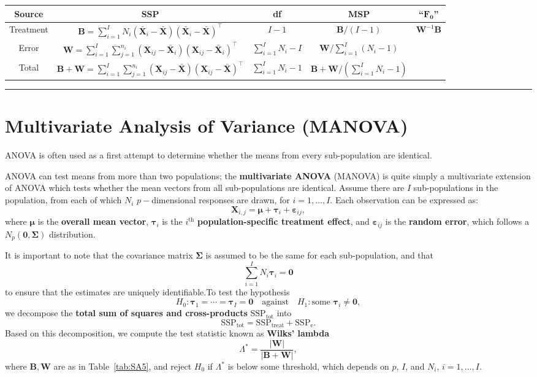 \begin{table*}[ht!]
         \centering
         \begin{tabular}{c c c c c}
         \hline
        \textbf{Source} & \textbf{SSP} & \textbf{df} & \textbf{MSP} & ``$\mathbf{F_0}$''\\
         \hline
         Treatment & $\bm{B}=\sum_{i=1}^{I}N_{i}(\bm{\bar{X}}_{i}-\bm{\bar{X}})(\bm{\bar{X}}_{i}-\bm{\bar{X}})^{\!\top}$ & $I-1$ & $\bm{B}/(I-1)$ & $\bm{W}^{-1}\bm{B}$\\
         Error & $\bm{W}=\sum_{i=1}^{I}\sum_{j=1}^{n_{i}}(\bm{X}_{ij}-\bm{\bar{X}}_{i})(\bm{X}_{ij}-\bm{\bar{X}}_{i})^{\!\top}$ & $\sum_{i=1}^{I}N_{i}-I$ & $\bm{W}/\sum_{i=1}^I(N_i-1)$\\
         Total & $\bm{B+W}=\sum_{i=1}^{I}\sum_{j=1}^{n_{i}}(\bm{X}_{ij}-\bm{\bar{X}})(\bm{X}_{ij}-\bm{\bar{X}})^{\!\top}$ & $\sum_{i=1}^{I}N_{i}-1$ & $\bm{B+W}/(\sum_{i=1}^{I}N_{i}-1)$\\
        \hline
         \end{tabular}
         \caption[\small One-way MANOVA table]{One-way MANOVA table; with $I$ sub-populations.}
         \label{tab:SA5}\hrule
     \end{table*}
     \afterpage{\FloatBarrier}
\section{Multivariate Analysis of Variance (MANOVA)}
ANOVA is often used as a first attempt to determine whether the means from every sub-population are identical.
\par
ANOVA can test means from more than two populations; the \textbf{multivariate ANOVA} (MANOVA) is quite simply a multivariate extension of ANOVA which tests whether the mean vectors from all sub-populations are identical.
\newl Assume there are $I$ sub-populations in the population, from each of which $N_i$ $p-$dimensional responses are drawn, for $i=1,\ldots,I$. Each observation can be expressed as:
     $$
    \bm{X}_{i,j}=\bm{\mu}+\bm{\tau}_{i}+\bm{\varepsilon}_{ij},
$$
where $\bm{\mu}$ is the \textbf{overall mean vector}, $\bm{\tau}_{i}$ is the $i^{\text{th}}$ \textbf{population-specific treatment effect}, and $\bm{\varepsilon}_{ij}$ is the \textbf{random error}, which follows a $N_{p}(\bm{0},\bm{\Sigma})$ distribution. \par It is important to note that the covariance matrix $\bm{\Sigma}$ is assumed to be the same for each sub-population, and that  $$\sum_{i=1}^{I}N_{i}\bm{\tau}_{i}=\bm{0}$$ to ensure that the estimates are uniquely identifiable.\newl To test the hypothesis $$H_{0}: \bm{\tau}_{1}=\cdots=\bm{\tau}_{I}=\bm{0}\quad\mbox{against}\quad H_{1}: \text{some } \bm{\tau}_{i}\neq \bm{0},$$ we decompose the \textbf{total sum of squares and cross-products} $\textrm{SSP}_{\textrm{tot}}$ into $$\textrm{SSP}_{\textrm{tot}}=\textrm{SSP}_{\textrm{treat}}+\textrm{SSP}_{\textrm{e}}.$$
Based on this decomposition, we compute the test statistic known as \textbf{Wilks' lambda} 
$$
    \Lambda^{*}=\frac{|\bm{W}|}{|\bm{B}+\bm{W}|},
$$
where $\bm{B},\bm{W}$ are as in Table~\ref{tab:SA5}, and reject $H_{0}$ if $\Lambda^{*}$ is below some threshold, which depends on $p$, $I$, and $N_i$, $i=1,\ldots, I$.   



